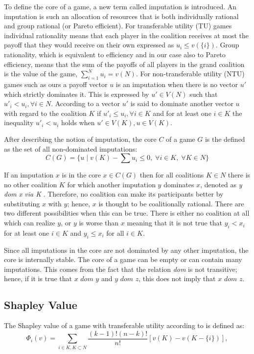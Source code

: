 {To define the core of a game, a new term called imputation is introduced. An imputation is such an allocation of resources that is both individually rational and group rational (or Pareto efficient). For transferable utility (TU) games individual rationality means that each player in the coalition receives at most the payoff that they would receive on their own expressed as $u_i \leq v(\{i\})$. Group rationality, which is equivalent to efficiency and in our case also to Pareto efficiency, means that the sum of the payoffs of all players in the grand coalition is the value of the game, $\sum_{i=1}^{N} u_i = v(N)$. For non-transferable utility (NTU) games such as ours a payoff vector $u$ is an imputation when there is no vector $u'$ which strictly dominates it. This is expressed by $u' \in V(N)$ such that $u'_i < u_i, \forall i\in N$. According to \citet{holler2006einfuhrung} a vector $u'$ is said to dominate another vector $u$ with regard to the coalition $K$ if $u'_i \leq u_i, \forall i \in K$ and for at least one $i \in K$ the inequality $u'_i < u_i$ holds when $u' \in V(K), u \in V(K)$.

After describing the notion of imputation, the core $C$ of a game $G$ is the defined as the set of all non-dominated imputations:
\begin{equation}
\label{eq:core}
C(G) = \big\{u \;|\; v(K) - \sum u_i \leq 0, \; \forall i \in K, \; \forall K \in N \big\}
\end{equation}

If an imputation $x$ is in the core $x \in C(G)$ then for all coalitions $K \in N$ there is no other coalition $K$ for which another imputation $y$ dominates $x$, denoted as \textit{y dom x via K} \citep{holler2006einfuhrung}. Therefore, no coalition can make its participants better by substituting $x$ with $y$; hence, $x$ is thought to be coalitionally rational. There are two different possibilities when this can be true. There is either no coalition at all which can realize $y$, or $y$ is worse than $x$ meaning that it is not true that $y_i < x_i$ for at least one $i \in K$ and $y_i \leq x_i$ for all $i \in K$. 

Since all imputations in the core are not dominated by any other imputation, the core is internally stable. The core of a game can be empty or can contain many imputations. This comes from the fact that the relation \textit{dom} is not transitive; hence, if it is true that $x$ $dom$ $y$ and $y$ $dom$ $z$, this does not imply that $x$ $dom$ $z$.

\subsection{Shapley Value}
\label{subsec:shapleyfund}
The Shapley value of a game with transferable utility according to \citet{holler2006einfuhrung} is defined as:
\begin{equation}
\label{eq:shapley}
\Phi_i(v) = \sum_{i \in K, K \subset N} \frac{(k-1)!(n-k)!}{n!} [ v(K) - v(K - \{i\})],
\end{equation}

}
